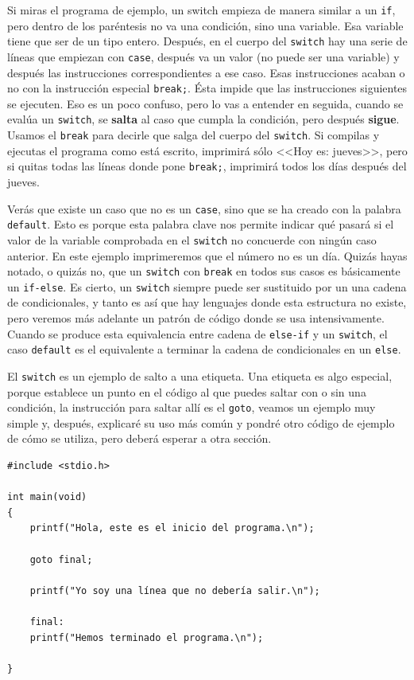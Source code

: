\documentclass[a4paper]{article}
\begin{document}
Si miras el programa de ejemplo, un switch empieza de manera similar a un
\verb!if!, pero dentro de los paréntesis no va una condición, sino una variable.
Esa variable tiene que ser de un tipo entero. Después, en el cuerpo del
\verb!switch! hay una serie de líneas que empiezan con \verb!case!, después va
un valor (no puede ser una variable) y después las instrucciones
correspondientes a ese caso. Esas instrucciones acaban o no con la instrucción
especial \lstinline[style=C]!break;!. Ésta impide que las
instrucciones siguientes se ejecuten. Eso es un poco confuso, pero lo vas a
entender en seguida, cuando se evalúa un \verb!switch!, se \textbf{salta} al
caso que cumpla la condición, pero después \textbf{sigue}. Usamos el \verb!break!
para decirle que salga del cuerpo del \verb!switch!. Si compilas y ejecutas el
programa como está escrito, imprimirá sólo <<Hoy es: jueves>>, pero si quitas
todas las líneas donde pone \verb!break;!, imprimirá todos los días después del
jueves.

Verás que existe un caso que no es un \verb!case!, sino que se ha creado
con la palabra \verb!default!. Esto es porque esta palabra clave nos permite
indicar qué pasará si el valor de la variable comprobada en el \verb!switch!
no concuerde con ningún caso anterior. En este ejemplo imprimeremos que el
número no es un día.
Quizás hayas notado, o quizás no, que un \verb!switch! con \verb!break! en todos
sus casos es básicamente un \verb!if-else!. Es cierto, un \verb!switch! siempre
puede ser sustituido por un una cadena de condicionales, y tanto es así que hay
lenguajes donde esta estructura no existe, pero veremos más adelante un patrón
de código donde se usa intensivamente. Cuando se produce esta equivalencia entre
cadena de \verb!else-if! y un \verb!switch!, el caso \verb!default! es el
equivalente a terminar la cadena de condicionales en un \verb!else!.

El \verb!switch! es un ejemplo de salto a una etiqueta. Una etiqueta es algo
especial, porque establece un punto en el código al que puedes saltar con o sin
una condición, la instrucción para saltar allí es el \verb!goto!, veamos un
ejemplo muy simple y, después, explicaré su uso más común y pondré otro código
de ejemplo de cómo se utiliza, pero deberá esperar a otra sección.

\noindent
\begin{minipage}[H]{\linewidth}
\mbox{}
\begin{lstlisting}[style=C,
caption={Ejemplo de programa con un \texttt{goto}},
label={lst:gotoExample}]
#include <stdio.h>

int main(void)
{
    printf("Hola, este es el inicio del programa.\n");

    goto final;

    printf("Yo soy una línea que no debería salir.\n");

    final:
    printf("Hemos terminado el programa.\n");

}
\end{lstlisting}
\end{minipage}
\end{document}
